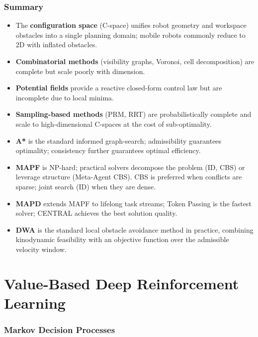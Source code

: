 \documentclass[11pt,a4paper]{article}
\theoremstyle{definition}
\theoremstyle{plain}
\theoremstyle{remark}
\begin{document}
\section{Summary}

\begin{itemize}
    \item The \textbf{configuration space} (C-space) unifies robot geometry and workspace obstacles into a single planning domain; mobile robots commonly reduce to 2D with inflated obstacles.
    \item \textbf{Combinatorial methods} (visibility graphs, Voronoi, cell decomposition) are complete but scale poorly with dimension.
    \item \textbf{Potential fields} provide a reactive closed-form control law but are incomplete due to local minima.
    \item \textbf{Sampling-based methods} (PRM, RRT) are probabilistically complete and scale to high-dimensional C-spaces at the cost of sub-optimality.
    \item \textbf{A*} is the standard informed graph-search; admissibility guarantees optimality; consistency further guarantees optimal efficiency.
    \item \textbf{MAPF} is NP-hard; practical solvers decompose the problem (ID, CBS) or leverage structure (Meta-Agent CBS). CBS is preferred when conflicts are sparse; joint search (ID) when they are dense.
    \item \textbf{MAPD} extends MAPF to lifelong task streams; Token Passing is the fastest solver; CENTRAL achieves the best solution quality.
    \item \textbf{DWA} is the standard local obstacle avoidance method in practice, combining kinodynamic feasibility with an objective function over the admissible velocity window.
\end{itemize}

\part{Value-Based Deep Reinforcement Learning}

\section{Markov Decision Processes}
\end{document}
